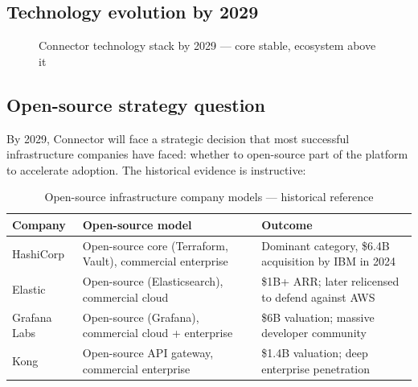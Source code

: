 \subsection{Technology evolution by 2029}

\begin{figure}[H]
\centering
{}
\caption{Connector technology stack by 2029 — core stable, ecosystem above it}
\label{fig:tech-2029}
\end{figure}

\subsection{Open-source strategy question}

By 2029, Connector will face a strategic decision that most successful
infrastructure companies have faced: whether to open-source part of the
platform to accelerate adoption. The historical evidence is instructive:

\begin{table}[H]
\centering
\renewcommand{\arraystretch}{1.45}
\begin{tabularx}{\textwidth}{@{}lXX@{}}
\toprule
\textbf{Company} & \textbf{Open-source model} & \textbf{Outcome} \\
\midrule
HashiCorp & Open-source core (Terraform, Vault), commercial enterprise & Dominant category, \$6.4B acquisition by IBM in 2024 \\
Elastic & Open-source (Elasticsearch), commercial cloud & \$1B+ ARR; later relicensed to defend against AWS \\
Grafana Labs & Open-source (Grafana), commercial cloud + enterprise & \$6B valuation; massive developer community \\
Kong & Open-source API gateway, commercial enterprise & \$1.4B valuation; deep enterprise penetration \\
\bottomrule
\end{tabularx}
\caption{Open-source infrastructure company models — historical reference}
\end{table}

